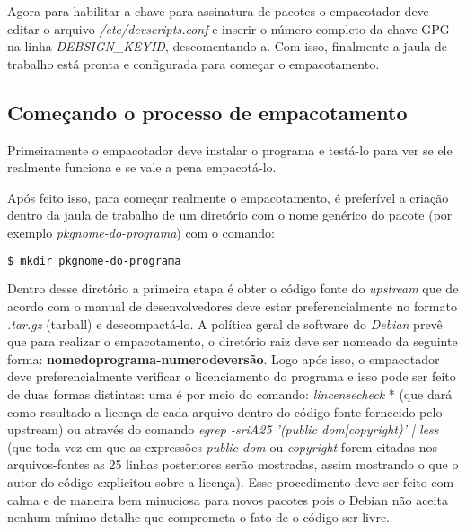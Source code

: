 Agora para habilitar a chave para assinatura de pacotes o empacotador deve editar o arquivo \textit{/etc/devscripts.conf} e inserir o número completo da chave GPG na linha \textit{DEBSIGN\_KEYID}, descomentando-a. Com isso, finalmente a jaula de trabalho está pronta e configurada para começar o empacotamento.

\subsection{Começando o processo de empacotamento}

Primeiramente o empacotador deve instalar o programa e testá-lo para ver se ele realmente funciona e se vale a pena empacotá-lo.

Após feito isso, para começar realmente o empacotamento, é preferível a criação dentro da jaula de trabalho de um diretório com o nome genérico do pacote (por exemplo \textit{pkgnome-do-programa}) com o comando: %

\begin{lstlisting}[language=bash]
	$ mkdir pkgnome-do-programa 
\end{lstlisting} 

Dentro desse diretório a primeira etapa é obter o código fonte do \textit{upstream} que de acordo com o manual de desenvolvedores deve estar preferencialmente no formato \textit{.tar.gz} (tarball) e descompactá-lo. A política geral de software do \textit{Debian} prevê que para realizar o empacotamento, o diretório raiz deve ser nomeado da seguinte forma: \textbf{nomedoprograma-numerodeversão}. Logo após isso, o empacotador deve preferencialmente verificar o licenciamento do programa e isso pode ser feito de duas formas distintas: uma é por meio do comando: \textit{lincensecheck} * %
(que dará como resultado a licença de cada arquivo dentro do código fonte fornecido pelo upstream) ou através do comando\textit{ egrep -sriA25 '(public dom|copyright)' | less} (que toda vez em que as expressões \textit{public dom} ou \textit{copyright} forem citadas nos arquivos-fontes as 25 linhas posteriores serão mostradas, assim mostrando o que o autor do código explicitou sobre a licença). Esse procedimento deve ser feito com calma e de maneira bem minuciosa para novos pacotes pois o Debian não aceita nenhum mínimo detalhe que comprometa o fato de o código ser livre.

